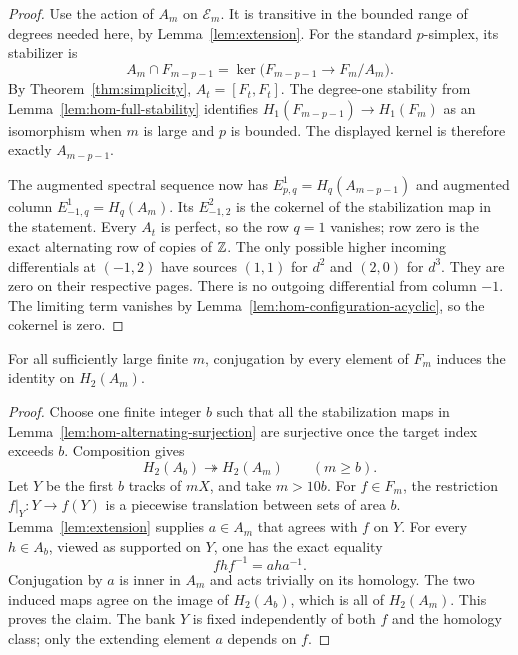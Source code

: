 \begin{proof}
Use the action of $A_m$ on $\mathcal E_m$.  It is transitive
in the bounded range of degrees needed here, by
Lemma~\ref{lem:extension}.  For the standard $p$-simplex, its
stabilizer is
\[
 A_m\cap F_{m-p-1}
 =\ker\bigl(F_{m-p-1}\longrightarrow F_m/A_m\bigr).
\]
By Theorem~\ref{thm:simplicity}, $A_t=[F_t,F_t]$.
The degree-one stability from
Lemma~\ref{lem:hom-full-stability} identifies
$H_1(F_{m-p-1})\to H_1(F_m)$ as an isomorphism when $m$ is
large and $p$ is bounded.  The displayed kernel is therefore
exactly $A_{m-p-1}$.

The augmented spectral sequence now has
$E^1_{p,q}=H_q(A_{m-p-1})$ and augmented column
$E^1_{-1,q}=H_q(A_m)$.  Its $E^2_{-1,2}$ is the cokernel
of the stabilization map in the statement.  Every $A_t$ is
perfect, so the row $q=1$ vanishes; row zero is the exact
alternating row of copies of $\mathbb Z$.  The only possible higher
incoming differentials at $(-1,2)$ have sources $(1,1)$ for
$d^2$ and $(2,0)$ for $d^3$.  They are zero on their respective
pages.  There is no outgoing differential from column $-1$.
The limiting term vanishes by
Lemma~\ref{lem:hom-configuration-acyclic}, so the cokernel
is zero.
\end{proof}

\begin{lemma}\label{lem:hom-trivial-action}
For all sufficiently large finite $m$, conjugation by every
element of $F_m$ induces the identity on $H_2(A_m)$.
\end{lemma}

\begin{proof}
Choose one finite integer $b$ such that all the stabilization
maps in Lemma~\ref{lem:hom-alternating-surjection} are
surjective once the target index exceeds $b$.  Composition gives
\[
 H_2(A_b)\twoheadrightarrow H_2(A_m)\qquad(m\geq b).
\]
Let $Y$ be the first $b$ tracks of $mX$, and take $m>10b$.
For $f\in F_m$, the restriction $f|_Y:Y\to f(Y)$ is a
piecewise translation between sets of area $b$.
Lemma~\ref{lem:extension} supplies $a\in A_m$ that agrees
with $f$ on $Y$.  For every $h\in A_b$, viewed as supported
on $Y$, one has the exact equality
\[
 f h f^{-1}=a h a^{-1}.
\]
Conjugation by $a$ is inner in $A_m$ and acts trivially on
its homology.  The two induced maps agree on the image of
$H_2(A_b)$, which is all of $H_2(A_m)$.  This proves the
claim.  The bank $Y$ is fixed independently of both $f$ and the
homology class; only the extending element $a$ depends on $f$.
\end{proof}

